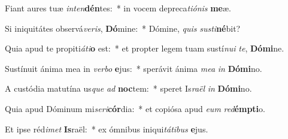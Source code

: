 \item Fiant aures tuæ \textit{in}\textit{ten}\textbf{dén}tes:~* in vocem depreca\textit{ti}\textit{ó}\textit{nis} \textbf{me}æ.
\item Si iniquitátes observá\textit{ve}\textit{ris}, \textbf{Dó}mine:~* Dómine, \textit{quis} \textit{sus}\textit{ti}\textbf{né}bit?
\item Quia apud te propiti\textit{á}\textit{ti}\textbf{o} est:~* et propter legem tuam sustí\textit{nu}\textit{i} \textit{te}, \textbf{Dó}\textbf{mi}ne.
\item Sustínuit ánima mea in \textit{ver}\textit{bo} \textbf{e}jus:~* sperávit ánima \textit{me}\textit{a} \textit{in} \textbf{Dó}\textbf{mi}no.
\item A custódia matutína us\textit{que} \textit{ad} \textbf{noc}tem:~* speret Is\textit{ra}\textit{ël} \textit{in} \textbf{Dó}\textbf{mi}no.
\item Quia apud Dóminum mi\textit{se}\textit{ri}\textbf{cór}dia:~* et copiósa apud \textit{e}\textit{um} \textit{red}\textbf{émp}\textbf{ti}o.
\item Et ipse réd\textit{i}\textit{met} \textbf{Is}raël:~* ex ómnibus iniqui\textit{tá}\textit{ti}\textit{bus} \textbf{e}jus.

